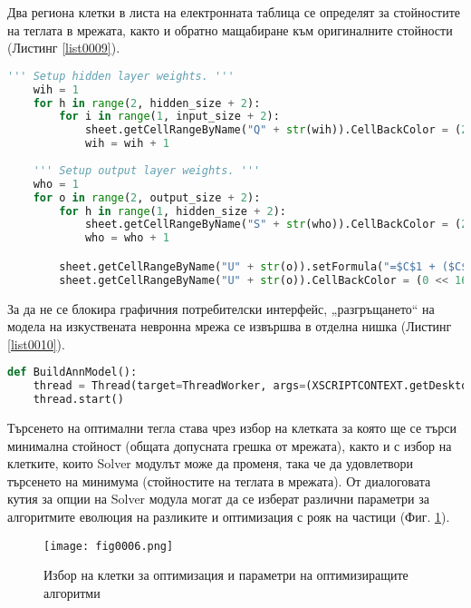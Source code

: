 Два региона клетки в листа на електронната таблица се определят за стойностите на теглата в мрежата, както и обратно мащабиране към оригиналните стойности (Листинг \ref{list0009}).

\begin{lstlisting}[caption=Определяне на региони за теглата на мрежата, language=Python, basicstyle=\tiny, label=list0009]
    ''' Setup hidden layer weights. '''
    wih = 1
    for h in range(2, hidden_size + 2):
        for i in range(1, input_size + 2):
            sheet.getCellRangeByName("Q" + str(wih)).CellBackColor = (255 << 16 | 0 << 8 | 255)
            wih = wih + 1
        
    ''' Setup output layer weights. '''
    who = 1
    for o in range(2, output_size + 2):
        for h in range(1, hidden_size + 2):
            sheet.getCellRangeByName("S" + str(who)).CellBackColor = (255 << 16 | 0 << 8 | 255)
            who = who + 1

        sheet.getCellRangeByName("U" + str(o)).setFormula("=$C$1 + ($C$2 - $C$1) * ((T" + str(o) + " - $C$4) / ($C$5 - $C$4))")
        sheet.getCellRangeByName("U" + str(o)).CellBackColor = (0 << 16 | 127 << 8 | 0)
\end{lstlisting}

За да не се блокира графичния потребителски интерфейс, „разгръщането“ на модела на изкуствената невронна мрежа се извършва в отделна нишка (Листинг \ref{list0010}).

\begin{lstlisting}[caption=Изпълнение с отделна нишка, language=Python, basicstyle=\tiny, label=list0010]
def BuildAnnModel():
    thread = Thread(target=ThreadWorker, args=(XSCRIPTCONTEXT.getDesktop(),))
    thread.start()
\end{lstlisting}

Търсенето на оптимални тегла става чрез избор на клетката за която ще се търси минимална стойност (общата допусната грешка от мрежата), както и с избор на клетките, които Solver модулът може да променя, така че да удовлетвори търсенето на минимума (стойностите на теглата в мрежата). От диалоговата кутия за опции на Solver модула могат да се изберат различни параметри за алгоритмите еволюция на разликите и оптимизация с рояк на частици (Фиг. \ref{fig0006}).

\begin{figure}[H]
  \centering
  \texttt{[image: fig0006.png]}
  \caption{Избор на клетки за оптимизация и параметри на оптимизиращите алгоритми}
\label{fig0006}
\end{figure}

